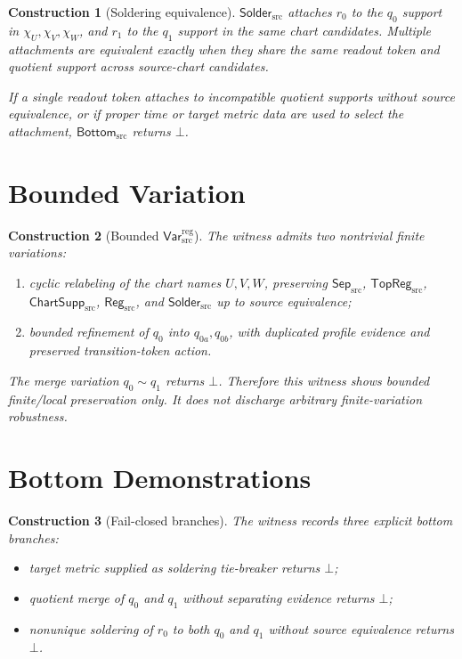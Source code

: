 \documentclass[11pt]{article}
\newcommand{\SepSrc}{\mathsf{Sep}_{\mathrm{src}}}
\newcommand{\TopRegSrc}{\mathsf{TopReg}_{\mathrm{src}}}
\newcommand{\ChartSuppSrc}{\mathsf{ChartSupp}_{\mathrm{src}}}
\newcommand{\RegSrc}{\mathsf{Reg}_{\mathrm{src}}}
\newcommand{\SolderSrc}{\mathsf{Solder}_{\mathrm{src}}}
\newcommand{\VarRegSrc}{\mathsf{Var}^{\mathrm{reg}}_{\mathrm{src}}}
\newcommand{\BottomSrc}{\mathsf{Bottom}_{\mathrm{src}}}
\newcommand{\Bot}{\bot}
\newtheorem{construction}{Construction}
\begin{document}
\begin{construction}[Soldering equivalence]
\(\SolderSrc\) attaches \(r_0\) to the \(q_0\) support in
\(\chi_U,\chi_V,\chi_W\), and \(r_1\) to the \(q_1\) support in the same
chart candidates. Multiple attachments are equivalent exactly when they share
the same readout token and quotient support across source-chart candidates.

If a single readout token attaches to incompatible quotient supports without
source equivalence, or if proper time or target metric data are used to
select the attachment, \(\BottomSrc\) returns \(\Bot\).
\end{construction}

\section{Bounded Variation}

\begin{construction}[Bounded \(\VarRegSrc\)]
The witness admits two nontrivial finite variations:
\begin{enumerate}
  \item cyclic relabeling of the chart names \(U,V,W\), preserving
  \(\SepSrc\), \(\TopRegSrc\), \(\ChartSuppSrc\), \(\RegSrc\), and
  \(\SolderSrc\) up to source equivalence;
  \item bounded refinement of \(q_0\) into \(q_{0a},q_{0b}\), with duplicated
  profile evidence and preserved transition-token action.
\end{enumerate}
The merge variation \(q_0\sim q_1\) returns \(\Bot\). Therefore this witness
shows bounded finite/local preservation only. It does not discharge arbitrary
finite-variation robustness.
\end{construction}

\section{Bottom Demonstrations}

\begin{construction}[Fail-closed branches]
The witness records three explicit bottom branches:
\begin{itemize}
  \item target metric supplied as soldering tie-breaker returns \(\Bot\);
  \item quotient merge of \(q_0\) and \(q_1\) without separating evidence
  returns \(\Bot\);
  \item nonunique soldering of \(r_0\) to both \(q_0\) and \(q_1\) without
  source equivalence returns \(\Bot\).
\end{itemize}
\end{construction}
\end{document}
